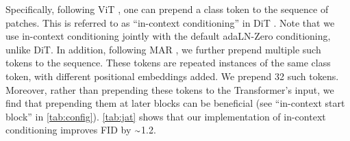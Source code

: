Specifically, following ViT \cite{Dosovitskiy2021}, one can prepend a class token to the sequence of patches. This is referred to as ``in-context conditioning'' in DiT \cite{Peebles2023}. 
Note that we use in-context conditioning jointly with the default adaLN-Zero conditioning, unlike DiT.
In addition, following MAR \cite{li2024autoregressive}, we further prepend multiple such tokens to the sequence. These tokens are repeated instances of the same class token, with different positional embeddings added. 
We prepend 32 such tokens.
Moreover, rather than prepending these tokens to the Transformer's input, we find that prepending them at later blocks can be beneficial (see ``in-context start block'' in \cref{tab:config}). 
\cref{tab:jat} shows that our implementation of in-context conditioning improves FID by $\app$1.2.


